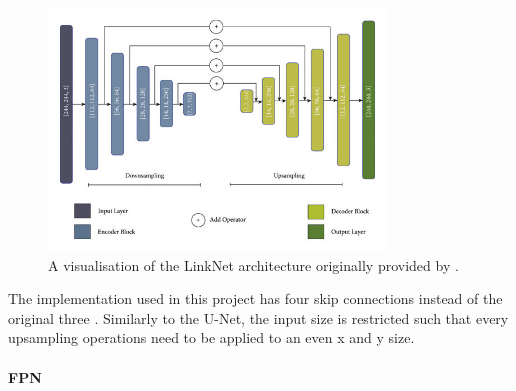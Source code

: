 \begin{figure}
	\centering
	\includegraphics[width=0.8\textwidth]{fig/linknet-architecture.jpg}
	\caption{A visualisation of the LinkNet architecture originally provided by \citeauthor{Norelyaqine2023} \cite{Norelyaqine2023}.}
	\label{fig:linknet-architecture}
\end{figure}



The implementation used in this project has four skip connections instead of the original three \cite{SegmentationModels}. Similarly to the U-Net, the input size is restricted such that every upsampling operations need to be applied to an even x and y size.

\paragraph{FPN}

